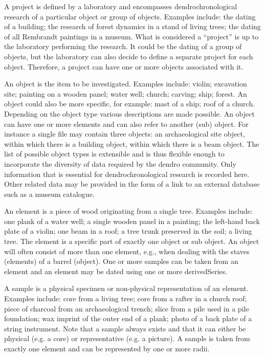 \begin{description*}

\item[A project] is defined by a laboratory and encompasses dendrochronological research of a particular object or group of objects. Examples include: the dating of a building; the research of forest dynamics in a stand of living trees; the dating of all Rembrandt paintings in a museum. What is considered a “project” is up to the laboratory performing the research. It could be the dating of a group of objects, but the laboratory can also decide to define a separate project for each object. Therefore, a project can have one or more objects associated with it.

\item[An object] is the item to be investigated. Examples include: violin; excavation site; painting on a wooden panel; water well; church; carving; ship; forest. An object could also be more specific, for example: mast of a ship; roof of a church. Depending on the object type various descriptions are made possible. An object can have one or more elements and can also refer to another (sub) object. For instance a single file may contain three objects: an archaeological site object, within which there is a building object, within which there is a beam object. The list of possible object types is extensible and is thus flexible enough to incorporate the diversity of data required by the dendro community. Only information that is essential for dendrochronological research is recorded here. Other related data may be provided in the form of a link to an external database such as a museum catalogue.

\item[An element] is a piece of wood originating from a single tree. Examples include: one plank of a water well; a single wooden panel in a painting; the left-hand back plate of a violin; one beam in a roof; a tree trunk preserved in the soil; a living tree. The element is a specific part of exactly one object or sub object. An object will often consist of more than one element, e.g., when dealing with the staves (elements) of a barrel (object). One or more samples can be taken from an element and an element may be dated using one or more derivedSeries.

\item[A sample] is a physical specimen or non-physical representation of an element. Examples include: core from a living tree; core from a rafter in a church roof; piece of charcoal from an archaeological trench; slice from a pile used in a pile foundation; wax imprint of the outer end of a plank; photo of a back plate of a string instrument. Note that a sample always exists and that it can either be physical (e.g. a core) or representative (e.g. a picture). A sample is taken from exactly one element and can be represented by one or more radii.


\end{description*}
